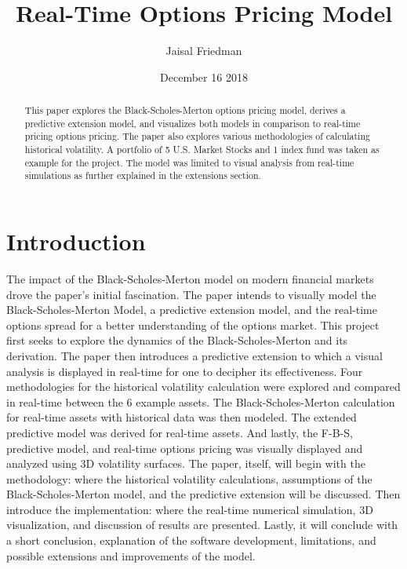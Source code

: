\documentclass{article}
\title{Real-Time Options Pricing Model}
\author{Jaisal Friedman}
\date{December 16 2018}
\begin{document}
\maketitle


\begin{abstract}
    This paper explores the Black-Scholes-Merton options pricing model, derives a predictive extension model, and visualizes both models in comparison to real-time pricing options pricing. The paper also explores various methodologies of calculating historical volatility. A portfolio of 5 U.S. Market Stocks and 1 index fund was taken as example for the project. The model was limited to visual analysis from real-time simulations as further explained in the extensions section. 
\end{abstract}


\section{Introduction}
\begin{flushleft} The impact of the Black-Scholes-Merton model on modern financial markets drove the paper's initial fascination. The paper intends to visually model the Black-Scholes-Merton Model, a predictive extension model, and the real-time options spread for a better understanding of the options market. This project first seeks to explore the dynamics of the Black-Scholes-Merton and its derivation. The paper then introduces a predictive extension to which a visual analysis is displayed in real-time for one to decipher its effectiveness. Four methodologies for the historical volatility calculation were explored and compared in real-time between the 6 example assets. The Black-Scholes-Merton calculation for real-time assets with historical data was then modeled. The extended predictive model was derived for real-time assets. And lastly, the F-B-S, predictive model, and real-time options pricing was visually displayed and analyzed using 3D volatility surfaces. The paper, itself, will begin with the methodology: where the historical volatility calculations, assumptions of the Black-Scholes-Merton model, and the predictive extension will be discussed. Then introduce the implementation: where the real-time numerical simulation, 3D visualization, and discussion of results are presented. Lastly, it will conclude with a short conclusion, explanation of the software development, limitations, and possible extensions and improvements of the model.
\end{flushleft}
\end{document}
